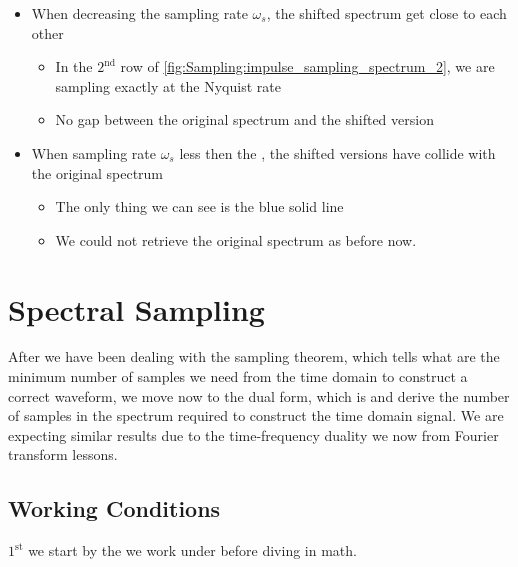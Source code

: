 \begin{itemize}

\item When decreasing the sampling rate $\omega_s$, the shifted spectrum get close to each other

	\begin{itemize}
	\item In the $\mathrm{2}^\mathrm{nd}$ row of \autoref{fig:Sampling:impulse_sampling_spectrum_2}, we are sampling exactly at the Nyquist rate
	
	\item No gap between the original spectrum and the shifted version
	\end{itemize}


\item When sampling rate $\omega_s$ less then the , the shifted versions have collide with the original spectrum 

	\begin{itemize}
	\item The only thing we can see is the blue solid line
	
	\item We could not retrieve the original spectrum as before now.
	\end{itemize}

\end{itemize}

\newpage
\section{Spectral Sampling}
\label{Sec:Sampling:Sepctral_Sampling}

After we have been dealing with the sampling theorem, which tells what are the minimum number of samples we need from the time domain to construct a correct waveform, we move now to the dual form, which is  and derive the number of samples in the spectrum required to construct the time domain signal. We are expecting similar results due to the time-frequency duality we now from Fourier transform lessons.

\subsection{Working Conditions}

$\mathrm{1}^\mathrm{st}$ we start by the  we work under before diving in math.

